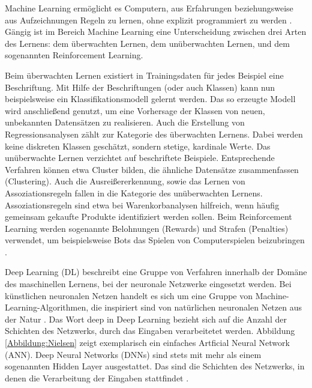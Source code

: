 Machine Learning ermöglicht es Computern, aus Erfahrungen beziehungsweise aus Aufzeichnungen Regeln zu lernen, ohne explizit programmiert zu werden \cite{samuel}. Gängig ist im Bereich Machine Learning eine Unterscheidung zwischen drei Arten des Lernens: dem überwachten Lernen, dem unüberwachten Lernen, und dem sogenannten Reinforcement Learning. 

Beim überwachten Lernen existiert in Trainingsdaten für jedes Beispiel eine Beschriftung. Mit Hilfe der Beschriftungen (oder auch Klassen) kann nun beispielsweise ein Klassifikationsmodell gelernt werden. Das so erzeugte Modell wird anschließend genutzt, um eine Vorhersage der Klassen von neuen, unbekannten Datensätzen zu realisieren. Auch die Erstellung von Regressionsanalysen zählt zur Kategorie des überwachten Lernens. Dabei werden keine diskreten Klassen geschätzt, sondern stetige, kardinale Werte. Das unüberwachte Lernen verzichtet auf beschriftete Beispiele. Entsprechende Verfahren können etwa Cluster bilden, die ähnliche Datensätze zusammenfassen (Clustering). Auch die Ausreißererkennung, sowie das Lernen von Assoziationsregeln fallen in die Kategorie des unüberwachten Lernens. Assoziationsregeln sind etwa bei Warenkorbanalysen hilfreich, wenn häufig gemeinsam gekaufte Produkte identifiziert werden sollen. Beim Reinforcement Learning werden sogenannte Belohnungen (Rewards) und Strafen (Penalties) verwendet, um beispielsweise Bots das Spielen von Computerspielen beizubringen \cite[S. 7-15]{Geron}.

Deep Learning (DL) beschreibt eine Gruppe von Verfahren innerhalb der Domäne des maschinellen Lernens, bei der neuronale Netzwerke eingesetzt werden. Bei künstlichen neuronalen Netzen handelt es sich um eine Gruppe von Machine-Learning-Algorithmen, die inspiriert sind von natürlichen neuronalen Netzen aus der Natur \cite[S. 2]{White}. Das Wort deep in Deep Learning bezieht sich auf die Anzahl der Schichten des Netzwerks, durch das Eingaben verarbeitetet werden. Abbildung \ref{Abbildung:Nielsen} zeigt exemplarisch ein einfaches Artficial Neural Network (ANN). Deep Neural Networks (DNNs) sind stets mit mehr als einem sogenannten Hidden Layer ausgestattet. Das sind die Schichten des Netzwerks, in denen die Verarbeitung der Eingaben stattfindet \cite{Nielsen}. 


